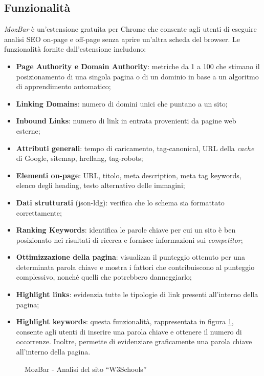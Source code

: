 \subsection{Funzionalità}
\textit{MozBar} è un'estensione gratuita per Chrome che consente agli utenti di eseguire analisi SEO \gls{on-page} e \gls{off-page} senza aprire un'altra scheda del browser. Le funzionalità fornite dall'estensione includono:
\begin{itemize}
    \item \textbf{Page Authority e Domain Authority}: metriche da 1 a 100 che stimano il posizionamento di una singola pagina o di un dominio in base a un algoritmo di apprendimento automatico;
    \item \textbf{Linking Domains}: numero di domini unici che puntano a un sito;
    \item \textbf{Inbound Links}: numero di link in entrata provenienti da pagine web esterne;
    \item \textbf{Attributi generali}: tempo di caricamento, \gls{tag-canonical}, URL della \textit{cache} di Google, \gls{sitemap}, \gls{hreflang}, \gls{tag-robots};
    \item \textbf{Elementi on-page}: URL, titolo, meta description, meta tag keywords, elenco degli heading, testo alternativo delle immagini;
    \item \textbf{Dati strutturati} (\gls{json-ldg}): verifica che lo schema sia formattato correttamente;
    \item \textbf{Ranking Keywords}: identifica le parole chiave per cui un sito è ben posizionato nei risultati di ricerca e fornisce informazioni sui \textit{competitor};
    \item \textbf{Ottimizzazione della pagina}: visualizza il punteggio ottenuto per una determinata parola chiave e mostra i fattori che contribuiscono al punteggio complessivo, nonché quelli che potrebbero danneggiarlo;
    \item \textbf{Highlight links}: evidenzia tutte le tipologie di link presenti all'interno della pagina;
    \item \textbf{Highlight keywords}: questa funzionalità, rappresentata in figura \ref{fig:mozbar}, consente agli utenti di inserire una parola chiave e ottenere il numero di occorrenze. Inoltre, permette di evidenziare graficamente una parola chiave all'interno della pagina.
\end{itemize}

\begin{figure}[H]
    \centering 
    \caption{MozBar - Analisi del sito “W3Schools”}
    \label{fig:mozbar}
\end{figure}

